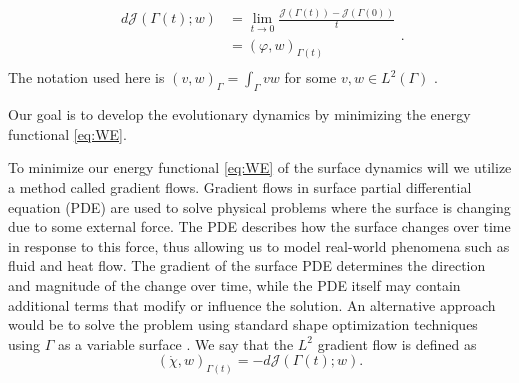 \begin{equation*}
    \begin{split}
d\mathcal{J} \left( \Gamma \left( t \right) ; w  \right)  & = \lim_{t \to 0} \frac{\mathcal{J}\left( \Gamma \left( t \right)  \right) - \mathcal{J} (  \Gamma \left( 0 \right))}{t} \\
&= \left(  \varphi ,w\right)_{\Gamma \left( t \right) }  \\
    \end{split}
.\end{equation*}
 The notation used here is $\left( v,w \right)_{\Gamma } = \int_{\Gamma }^{}  vw   $ for some $ v,w \in L^{2}\left( \Gamma \right) $ .

Our goal is to develop the evolutionary dynamics by minimizing the energy functional \eqref{eq:WE}.

To minimize our energy functional \eqref{eq:WE} of the surface dynamics will we utilize a method called gradient flows. Gradient flows in surface partial differential equation (PDE) are used to solve physical problems where the surface is changing due to some external force. The PDE describes how the surface changes over time in response to this force, thus allowing us to model real-world phenomena such as fluid and heat flow. The gradient of the surface PDE determines the direction and magnitude of the change over time, while the PDE itself may contain additional terms that modify or influence the solution. \cite{dogan2007discrete} An alternative approach would be to solve the problem using standard shape optimization techniques using $\Gamma$ as a variable surface \cite{dalphin2014study}.
We say that the $L^{2}$  gradient flow is defined as
\[
\left( \dot{\chi } , w \right)_{\Gamma \left( t \right)  } = -d\mathcal{J}\left( \Gamma \left( t \right); w  \right).
\]




